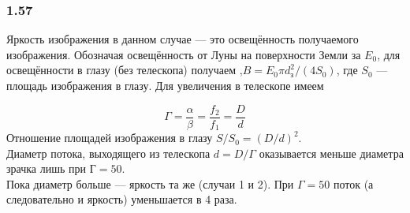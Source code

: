 \subsubsection*{1.57}

Яркость изображения в данном случае --- это освещённость получаемого изображения. Обозначая освещённость от Луны на поверхности Земли за $E_0$, для освещённости в глазу (без телескопа) получаем ,$B = E_0 \pi d_з^2 / (4S_0)$, где $S_0$ --- площадь изображения в глазу. Для увеличения в телескопе имеем

\begin{equation*}
	\Gamma = \frac{\alpha}{\beta} = \frac{f_2}{f_1}  = \frac{D}{d} 
\end{equation*}
Отношение площадей изображения в глазу $S/S_0 = (D/d)^2$.\\
Диаметр потока, выходящего из телескопа $d = D/\Gamma$ оказывается меньше диаметра зрачка лишь при $Г = 50$.\\
Пока диаметр больше --- яркость та же (случаи 1 и 2). При $\Gamma = 50$ поток (а следовательно и яркость) уменьшается в 4 раза.